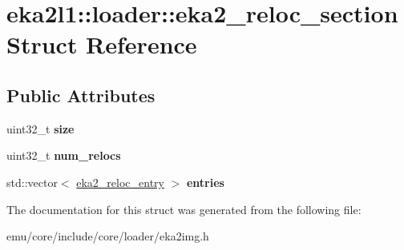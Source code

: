 \hypertarget{structeka2l1_1_1loader_1_1eka2__reloc__section}{}\section{eka2l1\+:\+:loader\+:\+:eka2\+\_\+reloc\+\_\+section Struct Reference}
\label{structeka2l1_1_1loader_1_1eka2__reloc__section}
\subsection*{Public Attributes}
\begin{DoxyCompactItemize}
\item 
\mbox{\label{structeka2l1_1_1loader_1_1eka2__reloc__section_ac28c3a7aaacb8829606c59575ec4bf64}} 
uint32\+\_\+t {\bfseries size}
\item 
\mbox{\label{structeka2l1_1_1loader_1_1eka2__reloc__section_a9e0d2441531fdb3198a46b414d84d594}} 
uint32\+\_\+t {\bfseries num\+\_\+relocs}
\item 
\mbox{\label{structeka2l1_1_1loader_1_1eka2__reloc__section_aa88349b1122ab1c5d3c53fd3d569eb0b}} 
std\+::vector$<$ \mbox{\hyperlink{structeka2l1_1_1loader_1_1eka2__reloc__entry}{eka2\+\_\+reloc\+\_\+entry}} $>$ {\bfseries entries}
\end{DoxyCompactItemize}


The documentation for this struct was generated from the following file\+:\begin{DoxyCompactItemize}
\item 
emu/core/include/core/loader/eka2img.\+h\end{DoxyCompactItemize}
